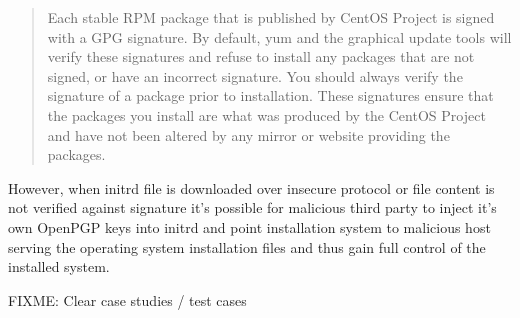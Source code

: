 \begin{quote}
Each stable RPM package that is published by CentOS Project is signed
with a GPG signature. By default, yum and the graphical update tools
will verify these signatures and refuse to install any packages that
are not signed, or have an incorrect signature. You should always
verify the signature of a package prior to installation. These
signatures ensure that the packages you install are what was produced
by the CentOS Project and have not been altered by any mirror or
website providing the packages.
\end{quote}

However, when initrd file is downloaded over insecure protocol or file
content is not verified against signature it's possible for malicious
third party to inject it's own OpenPGP keys into initrd and point
installation system to malicious host serving the operating system
installation files and thus gain full control of the installed system.

FIXME: Clear case studies / test cases
